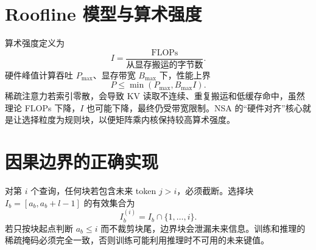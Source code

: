 \documentclass[UTF8,12pt,a4paper,fontset=none]{ctexart}
\numberwithin{equation}{section}
\begin{document}
\section{Roofline 模型与算术强度}
算术强度定义为
\begin{equation}
 I=\frac{\text{FLOPs}}{\text{从显存搬运的字节数}}.
\end{equation}
硬件峰值计算吞吐 $P_{\max}$、显存带宽 $B_{\max}$ 下，性能上界
\begin{equation}
 P\le\min(P_{\max},B_{\max}I).
\end{equation}
稀疏注意力若索引零散，会导致 KV 读取不连续、重复搬运和低缓存命中，虽然理论 FLOPs 下降，$I$ 也可能下降，最终仍受带宽限制。NSA 的“硬件对齐”核心就是让选择粒度为规则块，以便矩阵乘内核保持较高算术强度。

\section{因果边界的正确实现}
对第 $i$ 个查询，任何块若包含未来 token $j>i$，必须截断。选择块 $I_b=[a_b,a_b+l-1]$ 的有效集合为
\begin{equation}
 I_b^{(i)}=I_b\cap\{1,\ldots,i\}.
\end{equation}
若只按块起点判断 $a_b\le i$ 而不裁剪块尾，边界块会泄漏未来信息。训练和推理的稀疏掩码必须完全一致，否则训练可能利用推理时不可用的未来键值。
\end{document}
